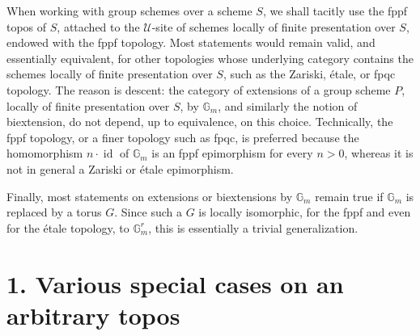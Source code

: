 \documentclass[11pt]{article}
\providecommand{\Gm}{\mathbb G_m}
\providecommand{\id}{\operatorname{id}}
\providecommand{\cU}{\mathcal U}
\begin{document}
When working with group schemes over a scheme \(S\), we shall tacitly use the fppf topos of \(S\), attached to the \(\cU\)-site of schemes locally of finite presentation over \(S\), endowed with the fppf topology.  Most statements would remain valid, and essentially equivalent, for other topologies whose underlying category contains the schemes locally of finite presentation over \(S\), such as the Zariski, étale, or fpqc topology.  The reason is descent: the category of extensions of a group scheme \(P\), locally of finite presentation over \(S\), by \(\Gm\), and similarly the notion of biextension, do not depend, up to equivalence, on this choice.  Technically, the fppf topology, or a finer topology such as fpqc, is preferred because the homomorphism \(n\cdot\id\) of \(\Gm\) is an fppf epimorphism for every \(n>0\), whereas it is not in general a Zariski or étale epimorphism.

Finally, most statements on extensions or biextensions by \(\Gm\) remain true if \(\Gm\) is replaced by a torus \(G\).  Since such a \(G\) is locally isomorphic, for the fppf and even for the étale topology, to \(\Gm^r\), this is essentially a trivial generalization.

\section*{1. Various special cases on an arbitrary topos}
\end{document}

